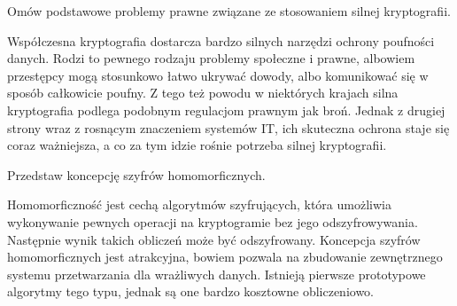 \documentclass[answers,11pt]{exam}
\begin{document}
\begin{questions}
\question Omów podstawowe problemy prawne związane ze stosowaniem silnej kryptografii.
\begin{solution}
Współczesna kryptografia dostarcza bardzo silnych narzędzi ochrony poufności danych. Rodzi to pewnego rodzaju problemy społeczne i prawne, albowiem przestępcy mogą stosunkowo łatwo ukrywać dowody, albo komunikować się w sposób całkowicie poufny. Z tego też powodu w niektórych krajach silna kryptografia podlega podobnym regulacjom prawnym jak broń. Jednak z drugiej strony wraz z rosnącym znaczeniem systemów IT, ich skuteczna ochrona staje się coraz ważniejsza, a co za tym idzie rośnie potrzeba silnej kryptografii.
\end{solution}

\question Przedstaw koncepcję szyfrów homomorficznych.
\begin{solution}
Homomorficzność jest cechą algorytmów szyfrujących, która umożliwia wykonywanie pewnych operacji na kryptogramie bez jego odszyfrowywania. Następnie wynik takich obliczeń może być  odszyfrowany. Koncepcja szyfrów homomorficznych jest atrakcyjna, bowiem pozwala na zbudowanie zewnętrznego systemu przetwarzania dla wrażliwych danych. Istnieją pierwsze prototypowe algorytmy tego typu, jednak są one bardzo kosztowne obliczeniowo.
\end{solution}

\end{questions}
\end{document}

